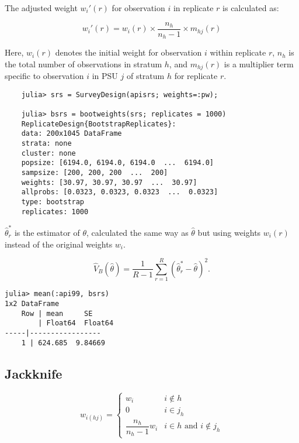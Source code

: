 \documentclass{juliacon}
\begin{document}
The adjusted weight $w_i'(r)$ for observation $i$ in replicate $r$ is calculated as:

\begin{equation}
    w_i'(r) = w_i(r) \times \frac{n_h}{n_h - 1} \times m_{hj}(r)
\end{equation}

Here, $w_i(r)$ denotes the initial weight for observation $i$ within replicate $r$, $n_h$ is the total number of observations in stratum $h$, and $m_{hj}(r)$ is a multiplier term specific to observation $i$ in PSU $j$ of stratum $h$ for replicate $r$.

\begin{lstlisting}
    julia> srs = SurveyDesign(apisrs; weights=:pw);
    
    julia> bsrs = bootweights(srs; replicates = 1000)
    ReplicateDesign{BootstrapReplicates}:
    data: 200x1045 DataFrame
    strata: none
    cluster: none
    popsize: [6194.0, 6194.0, 6194.0  ...  6194.0]
    sampsize: [200, 200, 200  ...  200]
    weights: [30.97, 30.97, 30.97  ...  30.97]
    allprobs: [0.0323, 0.0323, 0.0323  ...  0.0323]
    type: bootstrap
    replicates: 1000
\end{lstlisting}

$\hat{\theta}^*_r$ is the estimator of $\theta$, calculated the same way as $\hat{\theta}$ but using weights $w_i(r)$ instead of the original weights $w_i$. 

\begin{equation}
        \hat{V}_B(\hat{\theta}) = \dfrac{1}{R-1}\sum_{r=1}^{R} (\hat{\theta}^*_r - \hat{\theta})^2.
\end{equation}

\begin{lstlisting}
julia> mean(:api99, bsrs)
1x2 DataFrame
    Row | mean     SE      
        | Float64  Float64 
-----|-----------------
    1 | 624.685  9.84669
\end{lstlisting}

\subsection{Jackknife}

\begin{equation*}
    w_{i(hj)} = \begin{cases}
        w_i & i \notin h\\
    0 & i \in j_{h} \\
    \dfrac{n_h}{n_h - 1} w_i &  i \in h \text{ and } i \notin j_{h}
    \end{cases}
    \end{equation*} \cite{jackknifeLohr}
\end{document}
